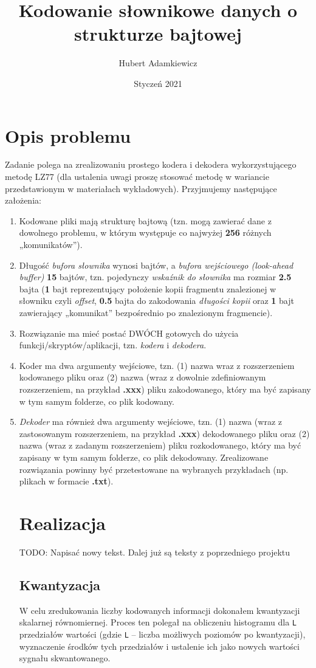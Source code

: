 \documentclass{article}
\title{Kodowanie słownikowe danych o strukturze bajtowej}
\author{Hubert Adamkiewicz}
\date{Styczeń 2021}
\def\code#1{\texttt{#1}}
\begin{document}
\maketitle

\section{Opis problemu}
Zadanie polega na zrealizowaniu prostego kodera i dekodera wykorzystującego metodę LZ77
(dla ustalenia uwagi proszę stosować metodę w wariancie przedstawionym w materiałach
wykładowych).
Przyjmujemy następujące założenia:
\begin{enumerate}
\item Kodowane pliki mają strukturę bajtową (tzn. mogą zawierać dane z dowolnego
problemu, w którym występuje co najwyżej \textbf{256} różnych „komunikatów”).
\item Długość \textit{bufora słownika} wynosi  bajtów, a \textit{bufora wejściowego (look-ahead buffer)}
\textbf{15} bajtów, tzn. pojedynczy \textit{wskaźnik do słownika} ma rozmiar \textbf{2.5} bajta (\textbf{1} bajt
reprezentujący położenie kopii fragmentu znalezionej w słowniku czyli \textit{offset}, \textbf{0.5} bajta
do zakodowania \textit{długości kopii} oraz \textbf{1} bajt zawierający „komunikat” bezpośrednio po
znalezionym fragmencie).
\item Rozwiązanie ma mieć postać DWÓCH gotowych do użycia funkcji/skryptów/aplikacji,
tzn. \textit{kodera} i \textit{dekodera}.
\item Koder ma dwa argumenty wejściowe, tzn. (1) nazwa wraz z rozszerzeniem
kodowanego pliku oraz (2) nazwa (wraz z dowolnie zdefiniowanym rozszerzeniem, na
przykład \textbf{.xxx}) pliku zakodowanego, który ma być zapisany w tym samym folderze,
co plik kodowany.
\item \textit{Dekoder} ma również dwa argumenty wejściowe, tzn. (1) nazwa (wraz z zastosowanym
rozszerzeniem, na przykład \textbf{.xxx}) dekodowanego pliku oraz (2) nazwa (wraz z
zadanym rozszerzeniem) pliku rozkodowanego, który ma być zapisany w tym samym
folderze, co plik dekodowany.
Zrealizowane rozwiązania powinny być przetestowane na wybranych przykładach (np. plikach
w formacie \textbf{.txt}).

\section{Realizacja}
TODO: Napisać nowy tekst. Dalej już są teksty z poprzedniego projektu
\subsection{Kwantyzacja}
W celu zredukowania liczby kodowanych informacji dokonałem kwantyzacji skalarnej równomiernej. 
Proces ten polegał na obliczeniu histogramu dla \code{L} przedziałów wartości (gdzie \code{L} -- liczba możliwych poziomów po kwantyzacji), wyznaczenie środków tych przedziałów i ustalenie ich jako nowych wartości sygnału skwantowanego.


\end{enumerate}
\end{document}
